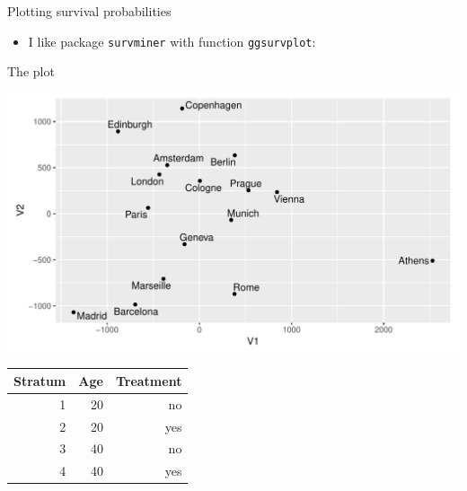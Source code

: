 \begin{frame}[fragile]{Plotting survival probabilities}
  
  \begin{itemize}
  \item I like package \texttt{survminer} with function \texttt{ggsurvplot}:
    
\begin{knitrout}
\color{fgcolor}\begin{kframe}
\begin{alltt}
\hlkwb{=}
\end{alltt}
\end{kframe}
\end{knitrout}
  \end{itemize}
  
\end{frame}

\begin{frame}[fragile]{The plot}
  
\begin{knitrout}
\color{fgcolor}\begin{kframe}
\begin{alltt}
\end{alltt}
\end{kframe}
\includegraphics[width=\maxwidth]{figure/unnamed-chunk-9-1} 

\end{knitrout}

\begin{small}
\begin{tabular}{rrr}
  Stratum& Age& Treatment \\
  \hline
  1 & 20 & no\\
  2 & 20 & yes\\
  3 & 40 & no\\
  4 & 40 & yes\\
  \hline
\end{tabular}  
\end{small}
  
\end{frame}

